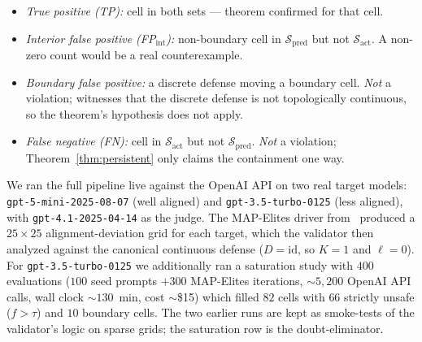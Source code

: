 \documentclass[11pt]{article}
\begin{document}
\begin{itemize}[nosep]
  \item \emph{True positive (TP):} cell in both sets — theorem
    confirmed for that cell.
  \item \emph{Interior false positive (FP$_{\mathrm{int}}$):} non-boundary
    cell in $\mathcal{S}_{\text{pred}}$ but not $\mathcal{S}_{\text{act}}$.
    A non-zero count would be a real counterexample.
  \item \emph{Boundary false positive:} a discrete defense moving a
    boundary cell. \emph{Not} a violation; witnesses that the discrete
    defense is not topologically continuous, so the theorem's
    hypothesis does not apply.
  \item \emph{False negative (FN):} cell in $\mathcal{S}_{\text{act}}$
    but not $\mathcal{S}_{\text{pred}}$. \emph{Not} a violation;
    Theorem~\ref{thm:persistent} only claims the containment one way.
\end{itemize}

We ran the full pipeline live against the OpenAI API on two real
target models: \texttt{gpt-5-mini-2025-08-07} (well aligned) and
\texttt{gpt-3.5-turbo-0125} (less aligned), with
\texttt{gpt-4.1-2025-04-14} as the judge. The MAP-Elites driver
from~\cite{munshi2026manifold} produced a $25 \times 25$
alignment-deviation grid for each target, which the validator then
analyzed against the canonical continuous defense
($D = \mathrm{id}$, so $K = 1$ and $\ell = 0$). For
\texttt{gpt-3.5-turbo-0125} we additionally ran a saturation study
with $400$ evaluations ($100$ seed prompts $+ 300$ MAP-Elites
iterations, $\sim$$5{,}200$ OpenAI API calls, wall clock
$\sim$$130$~min, cost $\sim$\$15) which filled $82$ cells with
$66$ strictly unsafe ($f > \tau$) and $10$ boundary cells. The
two earlier runs are kept as smoke-tests of the validator's logic
on sparse grids; the saturation row is the doubt-eliminator.
\end{document}
